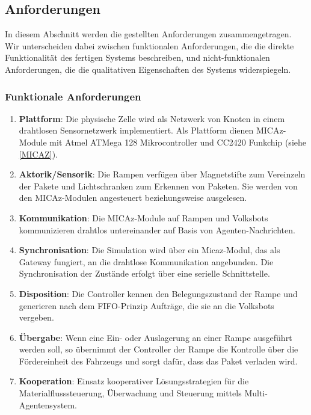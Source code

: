 \subsection{Anforderungen}
In diesem Abschnitt werden die gestellten Anforderungen zusammengetragen. Wir unterscheiden dabei zwischen funktionalen Anforderungen, die die direkte Funktionalität des fertigen Systems beschreiben, und nicht-funktionalen Anforderungen, die die qualitativen Eigenschaften des Systems widerspiegeln.
\subsubsection{Funktionale Anforderungen}
\begin{enumerate}
\item \textbf{Plattform}: Die physische Zelle wird als Netzwerk von Knoten in einem drahtlosen Sensornetzwerk implementiert. Als Plattform dienen MICAz-Module mit Atmel ATMega 128 Mikrocontroller und CC2420 Funkchip (siehe \autoref{MICAZ}).
 \item \textbf{Aktorik/Sensorik}: Die Rampen verfügen über Magnetstifte zum Vereinzeln der Pakete und Lichtschranken zum Erkennen von Paketen. Sie werden von den MICAz-Modulen angesteuert beziehungsweise ausgelesen.
 \item \textbf{Kommunikation}: Die MICAz-Module auf Rampen und Volksbots kommunizieren drahtlos untereinander auf Basis von Agenten-Nachrichten.
 \item \textbf{Synchronisation}: Die Simulation wird über ein Micaz-Modul, das als Gateway fungiert, an die drahtlose Kommunikation angebunden. Die Synchronisation der Zustände erfolgt über eine serielle Schnittstelle.
 \item \textbf{Disposition}: Die Controller kennen den Belegungszustand der Rampe und generieren nach dem FIFO-Prinzip Aufträge, die sie an die Volksbots vergeben.
 \item \textbf{Übergabe}: Wenn eine Ein- oder Auslagerung an einer Rampe ausgeführt werden soll, so übernimmt der Controller der Rampe die Kontrolle über die Fördereinheit des Fahrzeugs und sorgt dafür, dass das Paket verladen wird.
 \item \textbf{Kooperation}: Einsatz kooperativer Lösungsstrategien für die Materialflusssteuerung, Überwachung und Steuerung mittels Multi-Agentensystem.
\end{enumerate}

